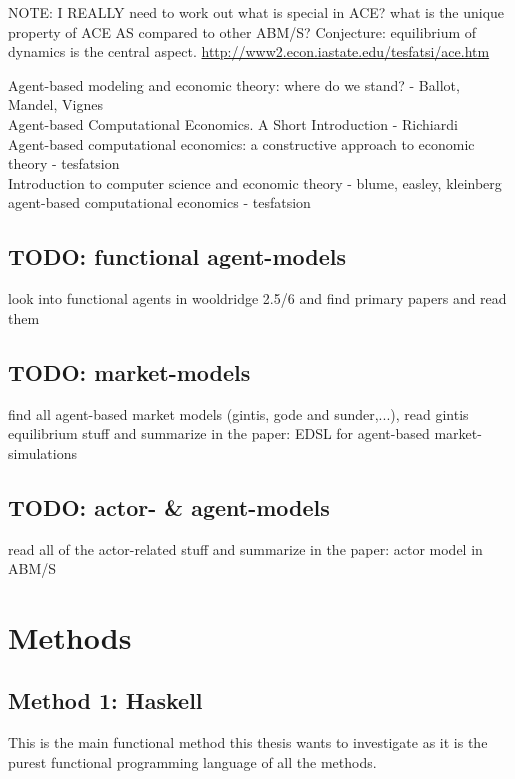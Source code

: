 \documentclass{article}
\begin{document}
NOTE: I REALLY need to work out what is special in ACE? what is the unique property of ACE AS compared to other ABM/S? Conjecture: equilibrium of dynamics is the central aspect.
\url{http://www2.econ.iastate.edu/tesfatsi/ace.htm}

\cite{mandel_2015} Agent-based modeling and economic theory: where do we stand? - Ballot, Mandel, Vignes \\
\cite{richiardi_2007} Agent-based Computational Economics. A Short Introduction - Richiardi \\
\cite{tesfatsion_2006} Agent-based computational economics: a constructive approach to economic theory - tesfatsion \\
\cite{kleinberg_easley_2015} Introduction to computer science and economic theory - blume, easley, kleinberg \\
\cite{tesfatsion_2002} agent-based computational economics - tesfatsion 

\subsection{TODO: functional agent-models}
look into functional agents in wooldridge 2.5/6 and find primary papers and read them

\subsection{TODO: market-models}
find all agent-based market models (gintis, gode and sunder,...), read gintis equilibrium stuff and summarize in the paper: EDSL for agent-based market-simulations

\subsection{TODO: actor- \& agent-models}
read all of the actor-related stuff and summarize in the paper: actor model in ABM/S


\section{Methods}
\subsection{Method 1: Haskell}
This is the main functional method this thesis wants to investigate as it is the purest functional programming language of all the methods.
\end{document}
